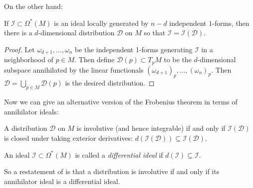 On the other hand:

\begin{lemma}\label{lem:ideal gives distribution}
	If $\mathcal{I} \subset \Omega^\ast(M)$ is an ideal locally generated by $n-d$ independent $1$-forms, then there is a $d$-dimensional distribution $\mathcal{D}$ on $M$ so that $\mathcal{I} = \mathcal{I}(\mathcal{D})$.
\end{lemma}

\begin{proof}
	Let $\omega_{d+1}, \dots , \omega_n$ be the independent 1-forms generating $\mathcal{I}$ in a neighborhood of $p \in M$. Then define $\mathcal{D}(p) \subset T_pM$ to be the $d$-dimensional subspace annihilated by the linear functionals $\left(\omega_{d+1}\right)_p, \dots , \left(\omega_n\right)_p$. Then $\mathcal{D} = \bigcup_{p \in M} \mathcal{D}(p)$ is the desired distribution.
\end{proof}

Now we can give an alternative version of the Frobenius theorem in terms of annihilator ideals:

\begin{theorem}\label{thm:Frobenius v2}
	A distribution $\mathcal{D}$ on $M$ is involutive (and hence integrable) if and only if $\mathcal{I}(\mathcal{D})$ is closed under taking exterior derivatives: $d(\mathcal{I}(\mathcal{D})) \subseteq \mathcal{I}(\mathcal{D})$.
\end{theorem}

\begin{definition}\label{def:differential ideal}
	An ideal $\mathcal{I} \subset \Omega^\ast(M)$ is called a \emph{differential ideal} if $d(\mathcal{I}) \subseteq \mathcal{I}$.
\end{definition}

So a restatement of  is that a distribution is involutive if and only if its annihilator ideal is a differential ideal.


